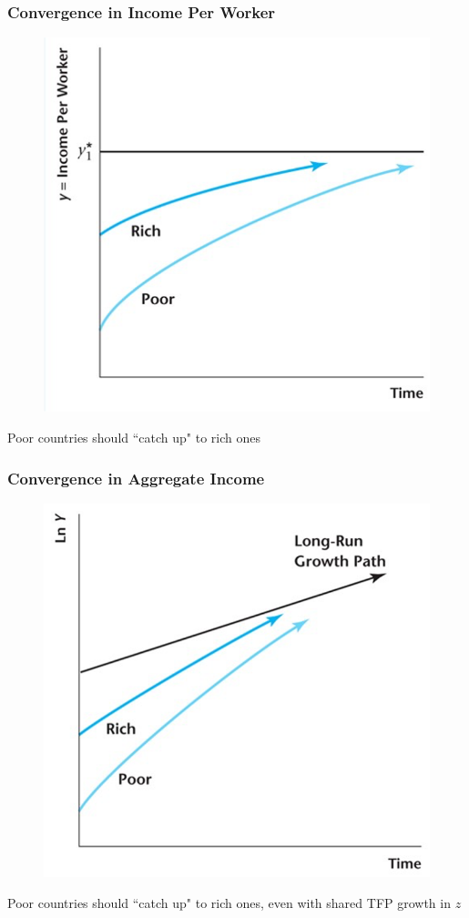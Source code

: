 \documentclass{beamer}
\begin{document}
\begin{frame}
\frametitle[alignment=center]{Convergence in Income Per Worker}
\begin{figure}
\centering
\includegraphics[scale=0.5]{Figures/W_Fig_8pt2.png}
\end{figure}
Poor countries should ``catch up" to rich ones
\end{frame}

\begin{frame}
\frametitle[alignment=center]{Convergence in Aggregate Income }
\begin{figure}
\centering
\includegraphics[scale=0.5]{Figures/W_Fig_8pt3.png}
\end{figure}
Poor countries should ``catch up" to rich ones, even with shared TFP growth in $z$
\end{frame}
\end{document}

